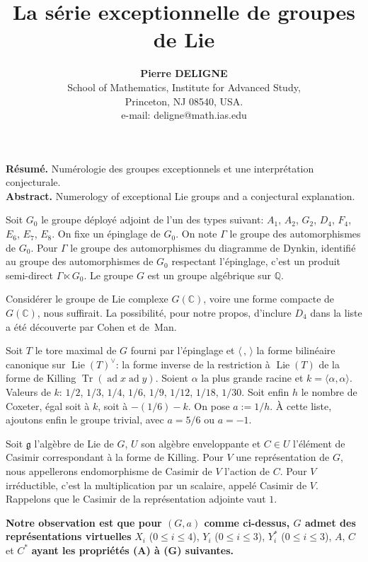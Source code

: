 \documentclass[11pt,a4paper]{article}
\title{\textbf{La s\'erie exceptionnelle de groupes de Lie}}
\author{\textbf{Pierre DELIGNE}\\[2pt]
\small School of Mathematics, Institute for Advanced Study,\\
\small Princeton, NJ 08540, USA.\\
\small e-mail: deligne@math.ias.edu}
\date{}
\DeclareMathOperator{\Tr}{Tr}
\DeclareMathOperator{\Lie}{Lie}
\DeclareMathOperator{\ad}{ad}
\newcommand{\frg}{\mathfrak{g}}
\newcommand{\C}{\mathbb{C}}
\newcommand{\Q}{\mathbb{Q}}
\begin{document}
\maketitle

\noindent\textbf{R\'esum\'e.} Num\'erologie des groupes exceptionnels et une interpr\'etation conjecturale.\\[2pt]
\textbf{Abstract.} Numerology of exceptional Lie groups and a conjectural explanation.

\bigskip

Soit $G_0$ le groupe d\'eploy\'e adjoint de l'un des types suivant: $A_1$, $A_2$, $G_2$, $D_4$, $F_4$, $E_6$, $E_7$, $E_8$.
On fixe un \'epinglage de $G_0$. On note $\Gamma$ le groupe des automorphismes de $G_0$. Pour $\Gamma$ le groupe des automorphismes du diagramme de Dynkin, identifi\'e au groupe des automorphismes de $G_0$ respectant l'\'epinglage, c'est un produit semi-direct $\Gamma \ltimes G_0$. Le groupe $G$ est un groupe alg\'ebrique sur $\Q$.

Consid\'erer le groupe de Lie complexe $G(\C)$, voire une forme compacte de $G(\C)$, nous suffirait. La possibilit\'e, pour notre propos, d'inclure $D_4$ dans la liste a \'et\'e d\'ecouverte par Cohen et de~Man.

Soit $T$ le tore maximal de $G$ fourni par l'\'epinglage et $\langle \, , \, \rangle$ la forme bilin\'eaire canonique sur $\Lie(T)^\vee$: la forme inverse de la restriction \`a $\Lie(T)$ de la forme de Killing $\Tr(\ad x \ad y)$. Soient $\alpha$ la plus grande racine et $k = \langle \alpha, \alpha \rangle$. Valeurs de $k$: $1/2$, $1/3$, $1/4$, $1/6$, $1/9$, $1/12$, $1/18$, $1/30$. Soit enfin $h$ le nombre de Coxeter, \'egal soit \`a $k$, soit \`a $-(1/6) - k$. On pose $a := 1/h$. \`A cette liste, ajoutons enfin le groupe trivial, avec $a = 5/6$ ou $a = -1$.

Soit $\frg$ l'alg\`ebre de Lie de $G$, $U$ son alg\`ebre enveloppante et $C \in U$ l'\'el\'ement de Casimir correspondant \`a la forme de Killing. Pour $V$ une repr\'esentation de $G$, nous appellerons endomorphisme de Casimir de $V$ l'action de $C$. Pour $V$ irr\'eductible, c'est la multiplication par un scalaire, appel\'e Casimir de $V$. Rappelons que le Casimir de la repr\'esentation adjointe vaut $1$.

\textbf{Notre observation est que pour $(G, a)$ comme ci-dessus, $G$ admet des repr\'esentations virtuelles}
$X_i$ ($0 \leq i \leq 4$), $Y_i$ ($0 \leq i \leq 3$), $Y_i^*$ ($0 \leq i \leq 3$), $A$, $C$ et $C^*$
\textbf{ayant les propri\'et\'es (A) \`a (G) suivantes.}
\end{document}
